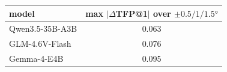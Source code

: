 \begin{tabular}{lc}
\toprule
model & max $|\Delta$TFP@1$|$ over $\pm0.5/1/1.5°$ \\
\midrule
Qwen3.5-35B-A3B & 0.063 \\
GLM-4.6V-Flash & 0.076 \\
Gemma-4-E4B & 0.095 \\
\bottomrule
\end{tabular}
